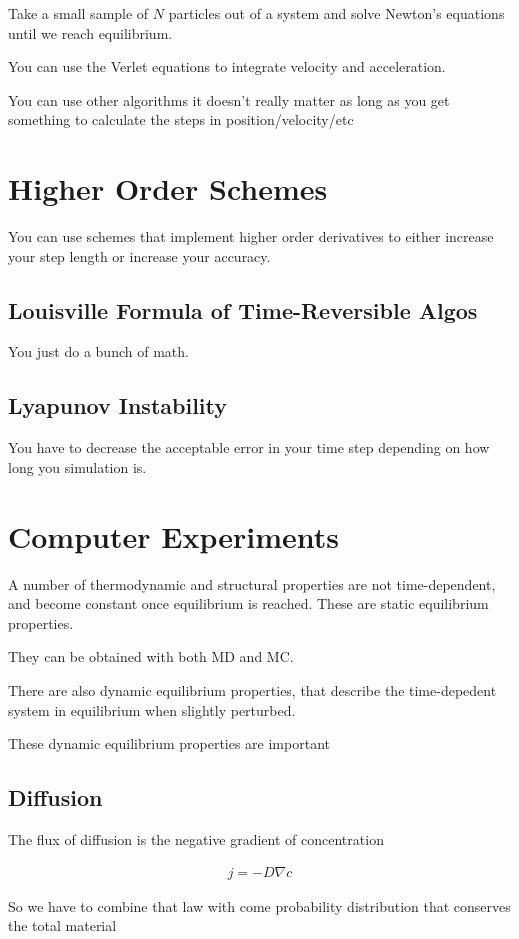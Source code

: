 \documentclass[fleqn]{report}
\newcommand{\equations} [1] {
\begin{gather*}
#1
\end{gather*}
}
\begin{document}
Take a small sample of $N$ particles out of a system and solve Newton's 
equations until we reach equilibrium. 

You can use the Verlet equations to integrate velocity 
and acceleration. 

You can use other algorithms it doesn't really matter as long 
as you get something to calculate the steps in position/velocity/etc 

\section{Higher Order Schemes}
You can use schemes that implement higher order derivatives to either 
increase your step length or increase your accuracy.

\subsection{Louisville Formula of Time-Reversible Algos}
You just do a bunch of math. 

\subsection{Lyapunov Instability}
You have to decrease the acceptable error in your time step depending on 
how long you simulation is. 

\section{Computer Experiments}
A number of thermodynamic and structural properties are not 
time-dependent, and become constant once equilibrium is reached. 
These are static equilibrium properties.

They can be obtained with both MD and MC. 

There are also dynamic equilibrium properties, that describe the time-depedent
system in equilibrium when slightly perturbed. 

These dynamic equilibrium properties are important 

\subsection{Diffusion}
The flux of diffusion is the negative gradient of concentration

\equations{
    j = - D \nabla c
}

So we have to combine that law with come probability distribution that 
conserves the total material
\end{document}
